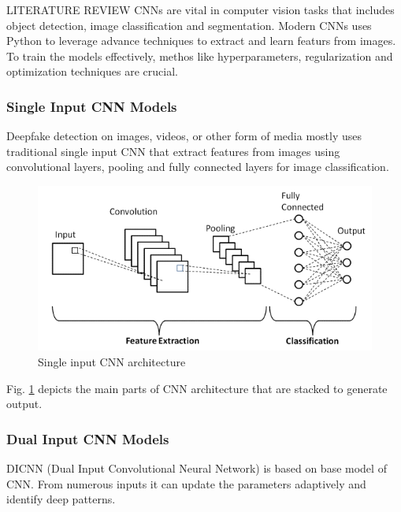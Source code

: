 \begin{section}[]{\uppercase{Literature Review}}
CNNs are vital in computer vision tasks that includes object detection, image classification and segmentation. Modern CNNs uses Python to leverage advance techniques to extract and learn featurs from images. To train the models effectively, methos like hyperparameters, regularization and optimization techniques are crucial.


 \subsubsection{Single Input CNN Models}
 Deepfake detection on images, videos, or other form of media mostly uses traditional single input CNN that extract features from images using convolutional layers, pooling and fully connected layers for image classification.
 \begin{figure}[htbp]
    \centering
    \includegraphics[width=\linewidth]{images/cnn-architecture.png}
    \caption{Single input CNN architecture}
    \label{fig:cnn-architecture}
\end{figure}

Fig. \ref{fig:cnn-architecture} depicts the main parts of CNN architecture that are stacked to generate output.


\subsubsection{Dual Input CNN Models}
DICNN (Dual Input Convolutional Neural Network) is based on base model of CNN. From numerous inputs it can update the parameters adaptively and identify deep patterns. 


\end{section}
